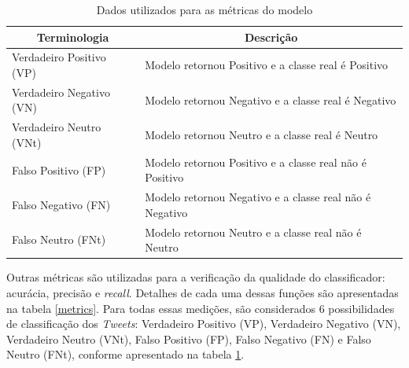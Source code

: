 \documentclass[12pt]{article}
\begin{document}
\begin{table}[H]
\centering
	\begin{tabular}{ll}
	\multicolumn{1}{c}{\textbf{Terminologia}} & \multicolumn{1}{c}{\textbf{Descrição}} \\ \hline
	Verdadeiro Positivo (VP) & Modelo retornou Positivo e a classe real é Positivo \\ \hline
	Verdadeiro Negativo (VN) & Modelo retornou Negativo e a classe real é Negativo \\ \hline
	Verdadeiro Neutro (VNt) & Modelo retornou Neutro e a classe real é Neutro \\ \hline
	Falso Positivo (FP) & Modelo retornou Positivo e a classe real não é Positivo \\ \hline
	Falso Negativo (FN) & Modelo retornou Negativo e a classe real não é Negativo \\ \hline
	Falso Neutro (FNt) & Modelo retornou Neutro e a classe real não é Neutro \\ \hline
	\end{tabular}
	\caption{Dados utilizados para as métricas do modelo}
	\label{metricsTrueFalse}
\end{table}

Outras métricas são utilizadas para a verificação da qualidade do classificador: acurácia, precisão e \emph{recall}. Detalhes de cada uma dessas funções são apresentadas na tabela \ref{metrics}. Para todas essas medições, são considerados 6 possibilidades de classificação dos \emph{Tweets}: Verdadeiro Positivo (VP), Verdadeiro Negativo (VN), Verdadeiro Neutro (VNt), Falso Positivo (FP), Falso Negativo (FN) e Falso Neutro (FNt), conforme apresentado na tabela \ref{metricsTrueFalse}.
\end{document}
